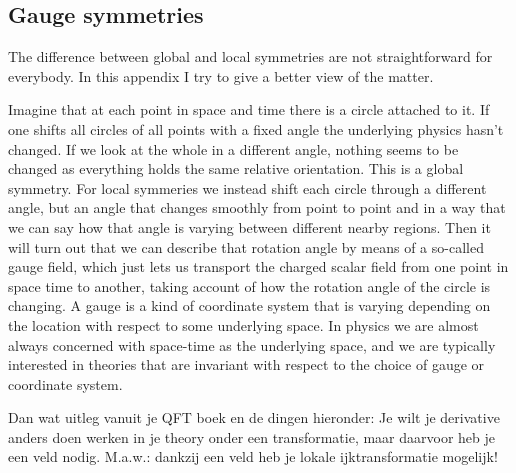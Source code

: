 \begin{appendices}
\chapter{Gauge symmetries}
The difference between global and local symmetries are not straightforward for everybody. In this appendix I try to give a better view of the matter.

Imagine that at each point in space and time there is a circle attached to it. If one shifts all circles of all points with a fixed angle the underlying physics hasn't changed. If we look at the whole in a different angle, nothing seems to be changed as everything holds the same relative orientation. This is a global symmetry. For local symmeries we instead shift each circle through a different angle, but an angle that changes smoothly from point to point and in a way that we can say how that angle is varying between different nearby regions. Then it will turn out that we can describe that rotation angle by means of a so-called gauge field, which just lets us transport the charged scalar field from one point in space time to another, taking account of how the rotation angle of the circle is changing. A gauge is a kind of coordinate system that is varying depending on the location with respect to some underlying space. In physics we are almost always concerned with space-time as the underlying space, and we are typically interested in theories that are invariant with respect to the choice of gauge or coordinate system. 

Dan wat uitleg vanuit je QFT boek en de dingen hieronder:
Je wilt je derivative anders doen werken in je theory onder een transformatie, maar daarvoor heb je een veld nodig. M.a.w.: dankzij een veld heb je lokale ijktransformatie mogelijk!





\end{appendices}

